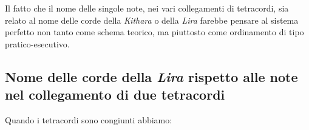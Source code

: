 \begin{figure}[htbp]
{}
\end{figure}

Il fatto che il nome delle singole note, nei vari collegamenti di tetracordi,
sia relato al nome delle corde della \emph{Kithara} o della \emph{Lira}
farebbe pensare al sistema perfetto non tanto come schema teorico, ma
piuttosto come ordinamento di tipo pratico-esecutivo.

\newpage


\subsection{Nome delle corde della \emph{Lira} rispetto alle note nel
            collegamento di due tetracordi}

Quando i tetracordi sono congiunti abbiamo:

